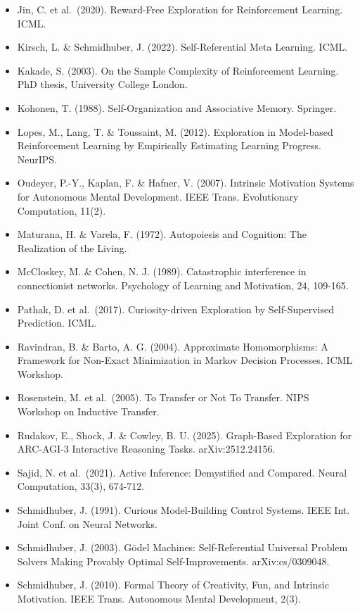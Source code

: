 \documentclass[
  11pt,
]{article}
\begin{document}
\begin{itemize}
\item
  Jin, C. et al.~(2020). Reward-Free Exploration for Reinforcement
  Learning. ICML.
\item
  Kirsch, L. \& Schmidhuber, J. (2022). Self-Referential Meta Learning.
  ICML.
\item
  Kakade, S. (2003). On the Sample Complexity of Reinforcement Learning.
  PhD thesis, University College London.
\item
  Kohonen, T. (1988). Self-Organization and Associative Memory.
  Springer.
\item
  Lopes, M., Lang, T. \& Toussaint, M. (2012). Exploration in
  Model-based Reinforcement Learning by Empirically Estimating Learning
  Progress. NeurIPS.
\item
  Oudeyer, P.-Y., Kaplan, F. \& Hafner, V. (2007). Intrinsic Motivation
  Systems for Autonomous Mental Development. IEEE Trans. Evolutionary
  Computation, 11(2).
\item
  Maturana, H. \& Varela, F. (1972). Autopoiesis and Cognition: The
  Realization of the Living.
\item
  McCloskey, M. \& Cohen, N. J. (1989). Catastrophic interference in
  connectionist networks. Psychology of Learning and Motivation, 24,
  109-165.
\item
  Pathak, D. et al.~(2017). Curiosity-driven Exploration by
  Self-Supervised Prediction. ICML.
\item
  Ravindran, B. \& Barto, A. G. (2004). Approximate Homomorphisms: A
  Framework for Non-Exact Minimization in Markov Decision Processes.
  ICML Workshop.
\item
  Rosenstein, M. et al.~(2005). To Transfer or Not To Transfer. NIPS
  Workshop on Inductive Transfer.
\item
  Rudakov, E., Shock, J. \& Cowley, B. U. (2025). Graph-Based
  Exploration for ARC-AGI-3 Interactive Reasoning Tasks.
  arXiv:2512.24156.
\item
  Sajid, N. et al.~(2021). Active Inference: Demystified and Compared.
  Neural Computation, 33(3), 674-712.
\item
  Schmidhuber, J. (1991). Curious Model-Building Control Systems. IEEE
  Int. Joint Conf. on Neural Networks.
\item
  Schmidhuber, J. (2003). Gödel Machines: Self-Referential Universal
  Problem Solvers Making Provably Optimal Self-Improvements.
  arXiv:cs/0309048.
\item
  Schmidhuber, J. (2010). Formal Theory of Creativity, Fun, and
  Intrinsic Motivation. IEEE Trans. Autonomous Mental Development, 2(3).

\end{itemize}
\end{document}
